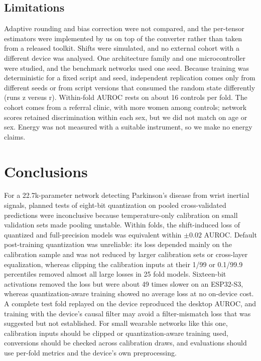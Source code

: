 \documentclass[preprint,12pt]{elsarticle}
\begin{document}
\subsection{Limitations}
Adaptive rounding and bias correction were not compared, and the per-tensor estimators were implemented by us on top of the converter rather than taken from a released toolkit. Shifts were simulated, and no external cohort with a different device was analysed. One architecture family and one microcontroller were studied, and the benchmark networks used one seed. Because training was deterministic for a fixed script and seed, independent replication comes only from different seeds or from script versions that consumed the random state differently (runs z versus r). Within-fold AUROC rests on about 16 controls per fold. The cohort comes from a referral clinic, with more women among controls; network scores retained discrimination within each sex, but we did not match on age or sex. Energy was not measured with a suitable instrument, so we make no energy claims.

\section{Conclusions}
\label{sec:conclusion}
For a 22.7k-parameter network detecting Parkinson's disease from wrist inertial signals, planned tests of eight-bit quantization on pooled cross-validated predictions were inconclusive because temperature-only calibration on small validation sets made pooling unstable. Within folds, the shift-induced loss of quantized and full-precision models was equivalent within $\pm0.02$ AUROC. Default post-training quantization was unreliable: its loss depended mainly on the calibration sample and was not reduced by larger calibration sets or cross-layer equalization, whereas clipping the calibration inputs at their 1/99 or 0.1/99.9 percentiles removed almost all large losses in 25 fold models. Sixteen-bit activations removed the loss but were about 49 times slower on an ESP32-S3, whereas quantization-aware training showed no average loss at no on-device cost. A complete test fold replayed on the device reproduced the desktop AUROC, and training with the device's causal filter may avoid a filter-mismatch loss that was suggested but not established. For small wearable networks like this one, calibration inputs should be clipped or quantization-aware training used, conversions should be checked across calibration draws, and evaluations should use per-fold metrics and the device's own preprocessing.
\end{document}

